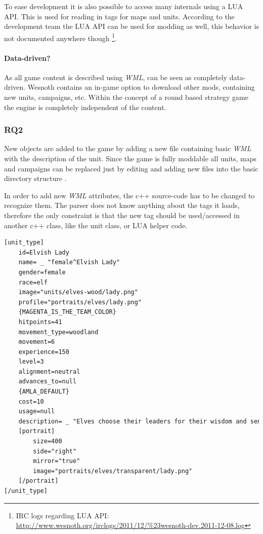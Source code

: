 To ease development it is also possible to access many internals using a LUA API. This is used for reading in
tags for maps and units. According to the development team the LUA API can be used for modding as well, this behavior
is not documented anywhere though \footnote{IRC logs regarding LUA API: \url{http://www.wesnoth.org/irclogs/2011/12/\%23wesnoth-dev.2011-12-08.log}}.

\paragraph{Data-driven?}
As all game content is described using \textit{WML}, \BOW{} can be seen as completely data-driven. Wesnoth contains an in-game option
to download other mods, containing new units, campaigns, etc. Within the concept of a round based strategy game the
engine is completely independent of the content.

\subsubsection{RQ2}
New objects are added to the game by adding a new file containing basic \textit{WML} with the description of the unit.
Since the game is fully moddable all units, maps and campaigns can be replaced just by editing and adding new files into
the basic directory structure \cite{wesnothaddunit}.

In order to add new \textit{WML} attributes, the c++ source-code has to be changed to recognize them. The \BOW{} parser
does not know anything about the tags it loads, therefore the only constraint is that the new tag should be used/accessed
in another c++ class, like the unit class, or LUA helper code.

\begin{lstlisting}[language=XML,caption=A basic (shortened) \BOW{} unit definition in WML, label=wesnothwml]
[unit_type]
    id=Elvish Lady
    name= _ "female^Elvish Lady"
    gender=female
    race=elf
    image="units/elves-wood/lady.png"
    profile="portraits/elves/lady.png"
    {MAGENTA_IS_THE_TEAM_COLOR}
    hitpoints=41
    movement_type=woodland
    movement=6
    experience=150
    level=3
    alignment=neutral
    advances_to=null
    {AMLA_DEFAULT}
    cost=10
    usage=null
    description= _ "Elves choose their leaders for their wisdom and sensitivity to the balance of universal forces; foresight is what has protected them in times of uncertainty. Their just reign is rewarded by the unflagging fealty of their people, which is the greatest gift for which any ruler could ask."
    [portrait]
        size=400
        side="right"
        mirror="true"
        image="portraits/elves/transparent/lady.png"
    [/portrait]
[/unit_type]
\end{lstlisting}

